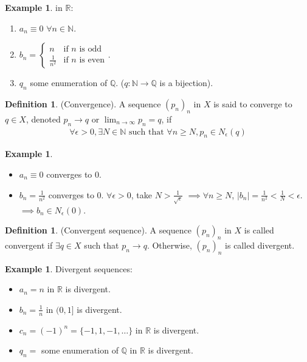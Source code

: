 \documentclass[10pt]{article}
\newcommand{\N}{\mathbb{N}}
\newcommand{\R}{\mathbb{R}}
\newcommand{\Q}{\mathbb{Q}}
\theoremstyle{definition}
\newtheorem{definition}[theorem]{Definition}
\newtheorem{example}[theorem]{Example}
\theoremstyle{remark}
\begin{document}
\begin{example}
    in $\R$:
    \begin{enumerate}
        \item $a_n \equiv 0$ $\forall n \in \N$.
        \item $b_n = \begin{cases} n & \text{if $n$ is odd} \\ \frac{1}{n^2} & \text{if $n$ is even} \end{cases}$.
        \item $q_n$ some enumeration of $\Q$. ($q: \N \to \Q$ is a bijection).
    \end{enumerate}
\end{example}

\begin{definition}
    (Convergence).
    A sequence $(p_n)_n$ in $X$ is said to converge to $q \in X$, denoted $p_n \to q$ or $\lim_{n \to \infty} p_n = q$, if
    \begin{align*}
        \forall \epsilon > 0, \exists N \in \N \text{ such that } \forall n \geq N, p_n \in N_\epsilon(q)
    \end{align*}
\end{definition}

\begin{example}
    \hfill
    \begin{itemize}
        \item $a_n \equiv 0$ converges to 0.
        \item $b_n = \frac{1}{n^2}$ converges to 0. $\forall \epsilon > 0$, take $N > \frac{1}{\sqrt{\epsilon}}$
            $\implies \forall n \geq N$, $|b_n| = \frac{1}{n^2} < \frac{1}{N} < \epsilon$.
            $\implies b_n \in N_\epsilon(0)$.
    \end{itemize}
\end{example}

\begin{definition}
    (Convergent sequence).
    A sequence $(p_n)_n$ in $X$ is called convergent if $\exists q \in X$ such that $p_n \to q$.
    Otherwise, $(p_n)_n$ is called divergent.
\end{definition}

\begin{example}
    Divergent sequences:
    \begin{itemize}
        \item $a_n = n$ in $\R$ is divergent.
        \item $b_n = \frac{1}{n}$ in $(0, 1]$ is divergent.
        \item $c_n = (-1)^n = \{-1, 1, -1, \ldots\}$ in $\R$ is divergent.
        \item $q_n =$ some enumeration of $\Q$ in $\R$ is divergent.
    \end{itemize}
\end{example}
\end{document}
